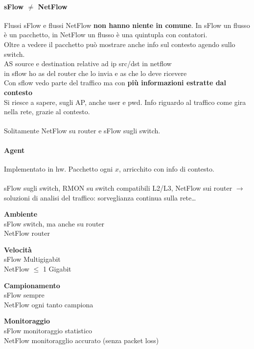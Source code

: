 \documentclass[10pt]{book}
\begin{document}
\paragraph{sFlow $\neq$ NetFlow} Flussi sFlow e flussi NetFlow \textbf{non hanno niente in comune}. In sFlow un flusso è un pacchetto, in NetFlow un flusso è una quintupla con contatori.\\
Oltre a vedere il pacchetto può mostrare anche info sul contesto agendo sullo switch.\\
AS source e destination relative ad ip src/dst in netflow\\
in sflow ho as del router che lo invia e as che lo deve ricevere\\
Con sflow vedo parte del traffico ma con \textbf{più informazioni estratte dal contesto}\\
Si riesce a sapere, sugli AP, anche user e pwd. Info riguardo al traffico come gira nella rete, grazie al contesto.\\\\
Solitamente NetFlow su router e sFlow sugli switch.
\paragraph{Agent} Implementato in hw. Pacchetto ogni $x$, arricchito con info di contesto.\\\\
sFlow sugli switch, RMON su switch compatibili L2/L3, NetFlow sui router $\rightarrow$ soluzioni di analisi del traffico: sorveglianza continua sulla rete\ldots
\begin{multicols}{2}
\begin{list}{}{}
	\item \textbf{Ambiente}\\sFlow switch, ma anche su router\\
	NetFlow router
	\item \textbf{Velocità}\\sFlow Multigigabit\\
	NetFlow $\leq$ 1 Gigabit
	\item \textbf{Campionamento}\\sFlow sempre\\
	NetFlow ogni tanto campiona
	\item \textbf{Monitoraggio}\\sFlow monitoraggio statistico\\
	NetFlow monitoragglio accurato (senza packet loss)
\end{list}
\end{multicols}
\end{document}
